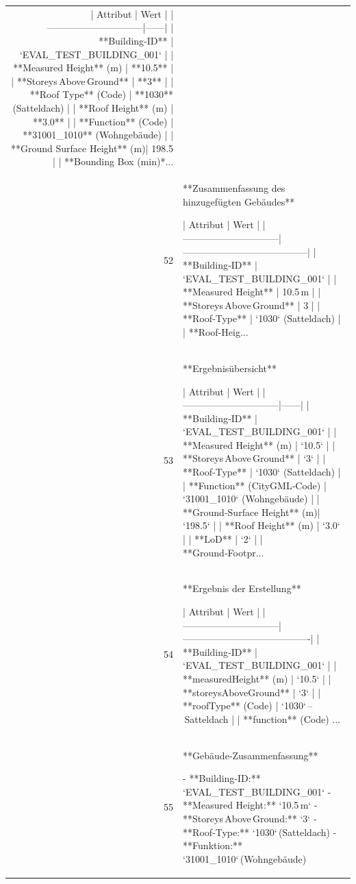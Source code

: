 \documentclass[a4paper,11pt]{article}
\begin{document}
\begin{table}[ht]
\begin{tabular}{r p{12cm}}
| Attribut                     | Wert |
|------------------------------|------|
| **Building‑ID**              | `EVAL\_TEST\_BUILDING\_001` |
| **Measured Height** (m)      | **10.5** |
| **Storeys Above Ground**     | **3** |
| **Roof Type** (Code)         | **1030** (Satteldach) |
| **Roof Height** (m)          | **3.0** |
| **Function** (Code)          | **31001\_1010** (Wohngebäude) |
| **Ground Surface Height** (m)| 198.5 |
| **Bounding Box (min)*... \\
52 & **Zusammenfassung des hinzugefügten Gebäudes**

| Attribut                     | Wert                                  |
|------------------------------|---------------------------------------|
| **Building‑ID**              | `EVAL\_TEST\_BUILDING\_001`               |
| **Measured Height**          | 10.5 m                                |
| **Storeys Above Ground**     | 3                                     |
| **Roof‑Type**                | `1030` (Satteldach)                   |
| **Roof‑Heig... \\
53 & **Ergebnisübersicht**

| Attribut                     | Wert |
|------------------------------|------|
| **Building‑ID**              | `EVAL\_TEST\_BUILDING\_001` |
| **Measured Height** (m)      | `10.5` |
| **Storeys Above Ground**     | `3` |
| **Roof‑Type**                | `1030` (Satteldach) |
| **Function** (CityGML‑Code) | `31001\_1010` (Wohngebäude) |
| **Ground‑Surface Height** (m)| `198.5` |
| **Roof Height** (m)          | `3.0` |
| **LoD**                      | `2` |
| **Ground‑Footpr... \\
54 & **Ergebnis der Erstellung**

| Attribut                     | Wert                                   |
|------------------------------|----------------------------------------|
| **Building‑ID**              | `EVAL\_TEST\_BUILDING\_001`                |
| **measuredHeight** (m)       | `10.5`                                 |
| **storeysAboveGround**       | `3`                                    |
| **roofType** (Code)          | `1030` – Satteldach                    |
| **function** (Code)     ... \\
55 & **Gebäude‑Zusammenfassung**

- **Building‑ID:** `EVAL\_TEST\_BUILDING\_001`  
- **Measured Height:** `10.5 m`  
- **Storeys Above Ground:** `3`  
- **Roof‑Type:** `1030` (Satteldach)  
- **Funktion:** `31001\_1010` (Wohngebäude)  


\end{tabular}
\end{table}
\end{document}
